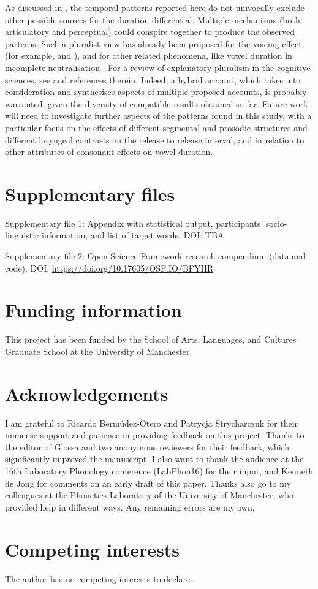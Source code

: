 \documentclass[charis]{glossa}
\begin{document}
As discussed in , the temporal patterns reported here do
not univocally exclude other possible sources for the duration
differential. Multiple mechanisms (both articulatory and perceptual)
could conspire together to produce the observed patterns. Such a
pluralist view has already been proposed for the voicing effect (for
example, \citealt{begus2017} and \citealt{sanker2018}), and for other
related phenomena, like vowel duration in incomplete neutralisation
\citep{winter2011}. For a review of explanatory pluralism in the
cognitive sciences, see \citet{dale2009} and references therein. Indeed,
a hybrid account, which takes into consideration and synthesises aspects
of multiple proposed accounts, is probably warranted, given the
diversity of compatible results obtained so far. Future work will need
to investigate further aspects of the patterns found in this study, with
a particular focus on the effects of different segmental and prosodic
structures and different laryngeal contrasts on the release to release
interval, and in relation to other attributes of consonant effects on
vowel duration.

\section*{Supplementary files}

Supplementary file 1: Appendix with statistical output, participants'
socio-linguistic information, and list of target words. DOI: TBA

\noindent Supplementary file 2: Open Science Framework research
compendium (data and code). DOI:
\url{https://doi.org/10.17605/OSF.IO/BFYHR}

\section*{Funding information}

This project has been funded by the School of Arts, Languages, and
Cultures Graduate School at the University of Manchester.

\section*{Acknowledgements}

I am grateful to Ricardo Bermúdez-Otero and Patrycja Strycharczuk for
their immense support and patience in providing feedback on this
project. Thanks to the editor of Glossa and two anonymous reviewers for
their feedback, which significantly improved the manuscript. I also want
to thank the audience at the 16th Laboratory Phonology conference
(LabPhon16) for their input, and Kenneth de Jong for comments on an
early draft of this paper. Thanks also go to my colleagues at the
Phonetics Laboratory of the University of Manchester, who provided help
in different ways. Any remaining errors are my own.

\section*{Competing interests}

The author has no competing interests to declare.


\end{document}
